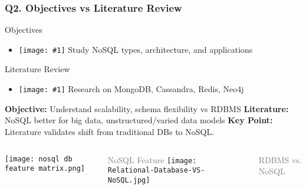 \documentclass{beamer}
\newcommand{\icon}[1]{\texttt{[image: \#1]}}
\begin{document}
\begin{frame}
\frametitle{Q2. Objectives vs Literature Review}
\vspace{-0.3cm}
\begin{block}{Objectives}
    \begin{itemize}
        \item \icon{check-mark.png} Study NoSQL types, architecture, and applications
    \end{itemize}
\end{block}
\vspace{-0.1cm}
\begin{block}{Literature Review}
    \begin{itemize}
        \item \icon{check-mark.png} Research on MongoDB, Cassandra, Redis, Neo4j
    \end{itemize}
\end{block}
\vspace{0.2cm}
\textbf{Objective:} Understand scalability, schema flexibility vs RDBMS
\textbf{Literature:} NoSQL better for big data, unstructured/varied data models
\textbf{Key Point:}  Literature validates shift from traditional DBs to NoSQL. 
\vspace{0.3cm}
\begin{columns}
    \texttt{[image: nosql db feature matrix.png]}
    \par\scriptsize\textcolor{gray}{NoSQL Feature}
    \texttt{[image: Relational-Database-VS-NoSQL.jpg]}
    \par\scriptsize\textcolor{gray}{RDBMS vs. NoSQL}
\end{columns}

\end{frame}
\end{document}
